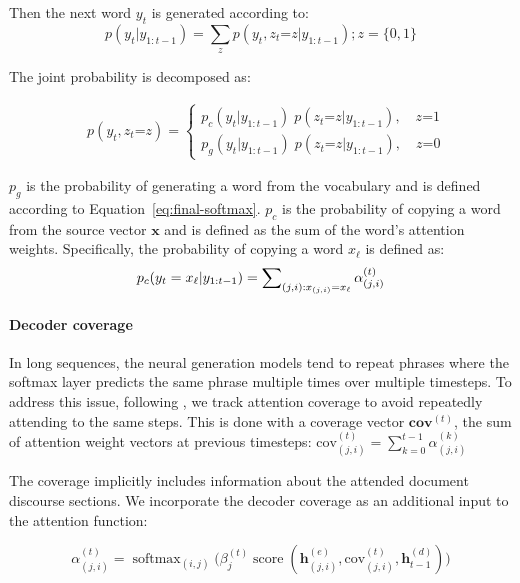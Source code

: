 \documentclass[11pt,a4paper]{article}
\newcommand{\V}[1][\mathbf]{#1}
\newcommand{\encstate}[1]{\mathbf{h}_{#1}^{(e)}}
\newcommand{\decstate}[1]{\mathbf{h}_{#1}^{(d)}}
\newcommand{\newsoftmax}{\mathop{\mathrm{softmax}}}
\DeclareMathOperator{\score}{score}
\def\Equal{\texttt{=}}
\begin{document}
Then the next word $y_t$ is generated according to:
$$ p(y_t|y_{1:t-1}) = \sum_z p(y_t, z_t\Equal z | y_{1:t-1}) ; z=\{0,1\} $$

The joint probability is decomposed as:
\vspace{-10pt}

{\small
\begin{align*}
  & p(y_t, z_t\Equal z) =
\begin{cases}
  p_{c}(y_t| y_{1:t-1}) \; p(z_t\Equal z|y_{1:t-1}), \quad z\Equal1 \\
  p_{g}(y_t| y_{1:t-1}) \; p(z_t\Equal  z|y_{1:t-1}), \quad z\Equal0
\end{cases}
\end{align*}
}

\noindent $p_g$ is the probability of generating a word from the vocabulary and is defined according to Equation~\ref{eq:final-softmax}.
$p_c$ is the probability of copying a word from the source vector $\V{x}$ and is defined as the sum of the word's attention weights. Specifically, the probability of copying a word $x_\ell$ is defined as:
{
\begin{equation}  p_{c}(y_t=x_\ell| y_{1:t-1}) = \sum\nolimits_{(j,i):x_{(j,i)}=x_\ell}\alpha^{(t)}_{(j,i)} \vspace{-9pt} \label{eq:pointer}
\end{equation}}





\paragraph{Decoder coverage}
In long sequences, the neural generation models tend to repeat phrases where the softmax layer predicts the same phrase multiple times over multiple timesteps.
To address this issue, following , we track attention coverage to avoid repeatedly attending to the same steps. This is done with a coverage vector $\V{cov}^{(t)}$, the sum of attention weight vectors at previous timesteps:
{\small $\mathrm{cov}^{(t)}_{(j,i)} = \sum_{k=0}^{t-1} \alpha^{(k)}_{(j,i)}$}

The coverage implicitly includes information about the attended document discourse sections. We incorporate the decoder coverage as an additional input to the attention function:

{\small
\begin{equation*}
\alpha^{(t)}_{(j,i)} = \newsoftmax_{(i,j)} \Big( \beta^{(t)}_j \score(\encstate{(j,i)}, \mathrm{cov}^{(t)}_{(j,i)} ,\decstate{t-1}) \Big) \label{eq:cov}
\end{equation*}
\vspace{-10pt}}
\normalsize
\end{document}

